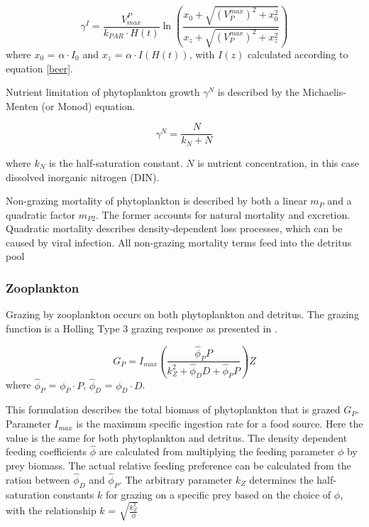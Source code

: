 \documentclass[template.tex]{subfiles}
\begin{document}
\begin{equation}
    \gamma^I = \frac{V^P_{max}}{k_{PAR} \cdot H(t)} \ln{ \left( \frac{ x_0+\sqrt{(V^{max}_P)^2+x_0^2} }{ x_z+\sqrt{(V^{max}_P)^2+x_z^2} } \right)}
\end{equation}
where $x_0$ = $\alpha \cdot I_0$ and $x_z$ = $\alpha \cdot I(H(t))$, with $I(z)$ calculated according to equation \eqref{beer}.

Nutrient limitation of phytoplankton growth $\gamma^N$ is described by the Michaelis-Menten (or Monod) equation.

\begin{equation}
    \gamma^N = \frac{N}{k_N + N}
\end{equation}

where $k_N$ is the half-saturation constant. $N$ is nutrient concentration, in this case dissolved inorganic nitrogen (DIN).

Non-grazing mortality of phytoplankton is described by both a linear $m_P$ and a quadratic factor $m_{P2}$. The former accounts for natural mortality and excretion. Quadratic mortality describes density-dependent loss processes, which can be caused by viral infection. All non-grazing mortality terms feed into the detritus pool

\subsubsection{Zooplankton}
Grazing by zooplankton occurs on both phytoplankton and detritus. The grazing function is a Holling Type 3 grazing response as presented in \citet{Anderson2015c}.

\begin{equation}
    G_P = I_{max} \left( \frac{ \hat{\phi}_P P}{k_Z^2 + \hat{\phi}_D D +\hat{\phi}_P P}  \right) Z
\end{equation}
where $\hat{\phi}_P$ = $\phi_P \cdot P$, $\hat{\phi}_D$ = $\phi_D \cdot D$.

This formulation describes the total biomass of phytoplankton that is grazed $G_P$. Parameter $I_{max}$ is the maximum specific ingestion rate for a food source. Here the value is the same for both phytoplankton and detritus. The density dependent feeding coefficients $\hat{\phi}$ are calculated from multiplying the feeding parameter $\phi$ by prey biomass. The actual relative feeding preference can be calculated from the ration between $\hat{\phi}_D$ and $\hat{\phi}_P$. The arbitrary parameter $k_Z$ determines the half-saturation constants $k$ for grazing on a specific prey based on the choice of $\phi$, with the relationship $k$ = $\sqrt{\frac{k^2_Z }{ \phi}}$
\end{document}
